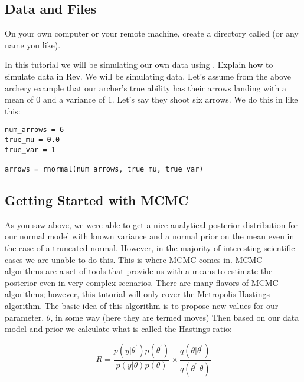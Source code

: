 \medskip
\subsection{Data and Files}\label{subsect:Exercise-DataFiles}

{\begin{framed}
On your own computer or your remote machine, create a directory called {\textcolor{red}{}} (or any name you like).

\end{framed}}

In this tutorial we will be simulating our own data using \RevBayes. Explain how to simulate data in Rev. We will be simulating data. Let's assume from the above archery example that our archer's true ability has their arrows landing with a mean of 0 and a variance of 1. Let's say they shoot six arrows. We do this in \RevBayes like this:

 {\tt \begin{snugshade*}
\begin{lstlisting}
num_arrows = 6
true_mu = 0.0
true_var = 1

arrows = rnormal(num_arrows, true_mu, true_var)

\end{lstlisting}
\end{snugshade*}}



\bigskip
\subsection{Getting Started with MCMC\label{subsect:Exercise-GetStart}}

As you saw above, we were able to get a nice analytical posterior distribution for our normal model with known variance and a normal prior on the mean even in the case of a truncated normal. However, in the majority of interesting scientific cases we are unable to do this. This is where MCMC comes in. MCMC algorithms are a set of tools that provide us with a means to estimate the posterior even in very complex scenarios. There are many flavors of MCMC algorithms; however, this tutorial will only cover the Metropolis-Hastings algorithm. The basic idea of this algorithm is to propose new values for our parameter, $\theta$, in some way (here they are termed moves) Then based on our data model and prior we calculate what is called the Hastings ratio:

\[ R = \frac{p( y | \theta^\prime  ) p(\theta^\prime) }{p( y | \theta ) p(\theta)}  \times \frac{ q( \theta | \theta^\prime )} { q( \theta^\prime | \theta) } \]

